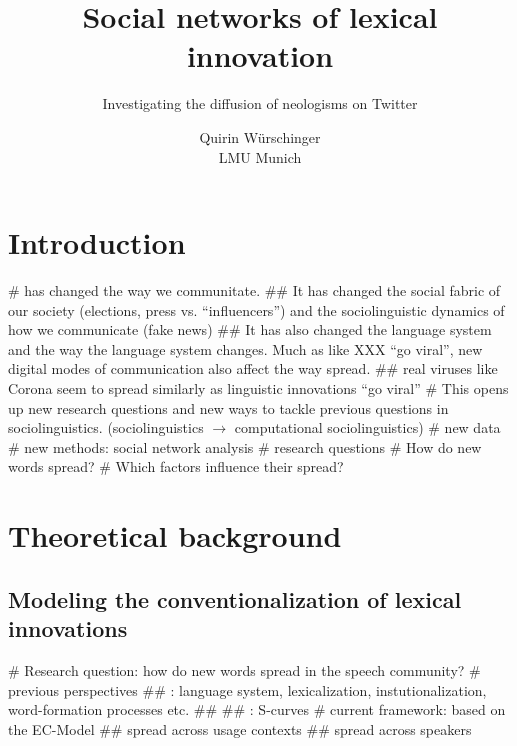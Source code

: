 \documentclass[
  a4paper,
  ]{scrartcl}
\begin{document}

  \title{Social networks of lexical innovation}
  \subtitle{Investigating the diffusion of neologisms on Twitter}
  \author{Quirin Würschinger\\ LMU Munich}
  \maketitle

\listoftodos

\tableofcontents


\section{Introduction}

  \begin{easylist}[itemize]
    #  has changed the way we communitate.
      ## It has changed the social fabric of our society (elections, press vs. \enquote{influencers}) and the sociolinguistic dynamics of how we communicate (fake news)
      ## It has also changed the language system and the way the language system changes. Much as  like XXX \enquote{go viral}, new digital modes of communication also affect the way  spread. 
      ## real viruses like Corona seem to spread similarly as linguistic innovations \enquote{go viral} \parencite{EandT2020}
    # This opens up new research questions and new ways to tackle previous questions in sociolinguistics. (sociolinguistics $\rightarrow$ computational sociolinguistics)
      # new data
      # new methods: social network analysis
    # research questions
      # How do new words spread?
      # Which factors influence their spread?
  \end{easylist}

\section{Theoretical background}

  \subsection{Modeling the conventionalization of lexical innovations}

    \begin{easylist}[itemize]
      # Research question: how do new words spread in the speech community?
      # previous perspectives
        ## : language system, lexicalization, instutionalization, word-formation processes etc. \cite{Bauer1983,Lipka2005}
        ##  \parencite{Schmid2008}
        ## : S-curves \parencite{Labov2007,Milroy1992}
      # current framework: based on the EC-Model \parencite{Schmid2020}
        ## spread across usage contexts
        ## spread across speakers
    \end{easylist}
\end{document}
